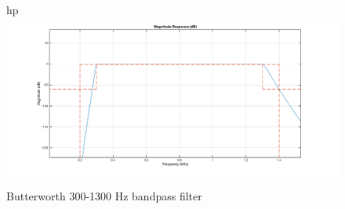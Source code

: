 \begin{figure}{hp}
  \centering
  \includegraphics[width=1\textwidth]{sections/butt_pass_scale.png}
  \caption{Butterworth 300-1300 Hz bandpass filter}
  \label{fig:butt_pass}
\end{figure}

